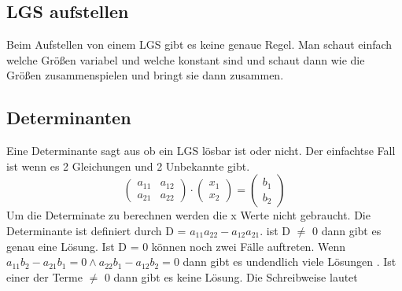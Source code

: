 \documentclass[a4paper,10pt]{scrartcl}
\begin{document}
        \subsection{LGS aufstellen}
            Beim Aufstellen von einem LGS gibt es keine genaue Regel. Man schaut einfach welche Größen variabel und welche konstant sind und schaut dann wie die Größen zusammenspielen und 
            bringt sie dann zusammen.
        \subsection{Determinanten}
        Eine Determinante sagt aus ob ein LGS lösbar ist oder nicht. Der einfachtse Fall ist wenn es 2 Gleichungen und 2 Unbekannte gibt. 
        \[
            \begin{pmatrix}
                a_{11} & a_{12} \\
                a_{21} & a_{22}
            \end{pmatrix}
            \cdot
            \begin{pmatrix}
                x_{1}  \\
                x_{2} 
            \end{pmatrix}
            =
            \begin{pmatrix}
                b_{1}  \\
                b_{2} 
            \end{pmatrix}
        \]
        Um die Determinate zu berechnen werden die x Werte nicht gebraucht. Die Determinante ist definiert durch D = $a_{11}a_{22} - a_{12}a_{21}$. ist D $\neq$ 0 dann gibt es genau eine Lösung.
        Ist D = 0 können noch zwei Fälle auftreten. Wenn $a_{11}b_2 - a_{21}b_1 = 0 \wedge a_{22}b_1 - a_{12}b_2 = 0 $ dann gibt es undendlich viele Lösungen . Ist einer der Terme $\neq$ 0 dann gibt es keine Lösung.
        Die Schreibweise lautet 
        
\end{document}
